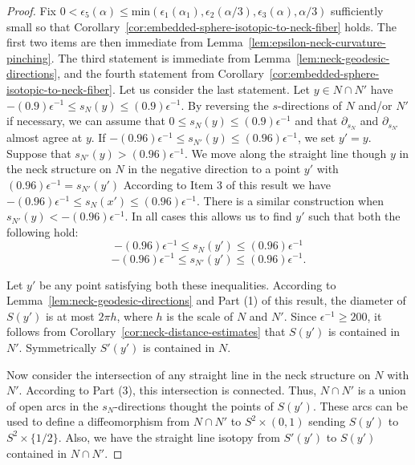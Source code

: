 \begin{proof}
Fix $0<\epsilon_5(\alpha)\le\mathrm{min}(\epsilon_1(\alpha_1),\epsilon_2(\alpha/3),\epsilon_3(\alpha),\alpha/3)$
sufficiently small so that Corollary~\ref{cor:embedded-sphere-isotopic-to-neck-fiber} holds. The
first two items are then immediate from Lemma~\ref{lem:epsilon-neck-curvature-pinching}. The
third statement is immediate from Lemma~\ref{lem:neck-geodesic-directions}, and the
fourth statement from Corollary~\ref{cor:embedded-sphere-isotopic-to-neck-fiber}. Let us consider
the last statement. Let $y\in N\cap N'$ have $-(0.9)\epsilon^{-1}\le
s_N(y)\le (0.9)\epsilon^{-1}$. By reversing the $s$-directions of
$N$ and/or $N'$ if necessary, we can assume that $0\le s_N(y)\le
(0.9)\epsilon^{-1}$ and that $\partial_{s_N}$ and
$\partial_{s_{N'}}$ almost agree at $y$. If $-(0.96)\epsilon^{-1}\le
s_{N'}(y)\le (0.96)\epsilon^{-1}$, we set $y'=y$. Suppose that
$s_{N'}(y)>(0.96)\epsilon^{-1}$. We move along the straight line
though $y$ in the neck structure on $N$ in the negative direction to
a point $y'$ with $(0.96)\epsilon^{-1}=s_{N'}(y')$ According to Item
3 of this result we have $-(0.96)\epsilon^{-1}\le s_{N}(x')\le
(0.96)\epsilon^{-1}$. There is a similar construction when
$s_{N'}(y)<-(0.96)\epsilon^{-1}$. In all cases this allows us to
find $y'$ such that both the following hold:
$$-(0.96)\epsilon^{-1}\le s_N(y')\le (0.96)\epsilon^{-1}$$
$$-(0.96)\epsilon^{-1}\le s_{N'}(y')\le (0.96)\epsilon^{-1}.$$

Let $y'$ be any point satisfying both these inequalities. According
to Lemma~\ref{lem:neck-geodesic-directions} and Part (1) of this result, the diameter
of $S(y')$ is at most $2\pi h$, where $h$  is the scale of $N$ and
$N'$. Since $\epsilon^{-1}\ge 200$, it follows from
Corollary~\ref{cor:neck-distance-estimates} that $S(y')$ is contained in $N'$.
Symmetrically $S'(y')$ is contained in $N$.

Now consider the intersection of any straight line in the neck
structure on $N$ with $N'$. According to Part (3), this intersection
is connected. Thus, $N\cap N'$ is a union of open arcs in the
$s_N$-directions thought the points of $S(y')$. These arcs can be
used to define a diffeomorphism from  $N\cap N'$  to $S^2\times
(0,1)$ sending $S(y')$ to $S^2\times \{1/2\}$. Also, we have the
straight line isotopy from $S'(y')$ to $S(y')$ contained in $N\cap
N'$.
\end{proof}






